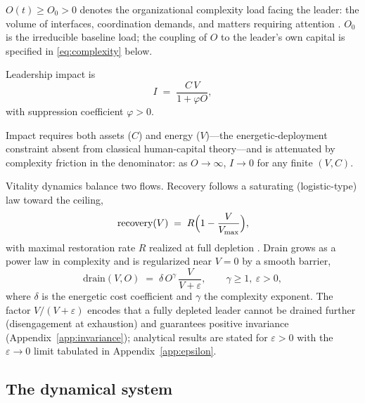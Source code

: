 \begin{definition}
\label{def:complexity}
$O(t) \ge O_0 > 0$ denotes the organizational complexity load facing the
leader: the volume of interfaces, coordination demands, and matters requiring
attention \citep{garicano2000hierarchies,hambrick2005executive}. $O_0$ is the
irreducible baseline load; the coupling of $O$ to the leader's own capital is
specified in \eqref{eq:complexity} below.
\end{definition}

\begin{definition}
\label{def:impact}
Leadership impact is
\begin{equation}
\label{eq:impact}
I \;=\; \frac{C\,V}{1+\varphi O},
\end{equation}
with suppression coefficient $\varphi>0$.
\end{definition}

Impact requires both assets ($C$) and energy ($V$)---the energetic-deployment
constraint absent from classical human-capital theory---and is attenuated by
complexity friction in the denominator: as $O\to\infty$, $I\to 0$ for any
finite $(V,C)$.

Vitality dynamics balance two flows. Recovery follows a saturating
(logistic-type) law toward the ceiling,
\begin{equation}
\label{eq:recovery}
\text{recovery}(V) \;=\; R\Bigl(1-\frac{V}{V_{\max}}\Bigr),
\end{equation}
with maximal restoration rate $R$ realized at full depletion
\citep{sonnentag2007recovery}. Drain grows as a power law in complexity and is
regularized near $V=0$ by a smooth barrier,
\begin{equation}
\label{eq:drain}
\text{drain}(V,O) \;=\; \delta\,O^{\gamma}\,\frac{V}{V+\varepsilon},
\qquad \gamma \ge 1,\ \varepsilon>0,
\end{equation}
where $\delta$ is the energetic cost coefficient and $\gamma$ the complexity
exponent. The factor $V/(V+\varepsilon)$ encodes that a fully depleted leader
cannot be drained further (disengagement at exhaustion) and guarantees
positive invariance (Appendix~\ref{app:invariance}); analytical results are
stated for $\varepsilon>0$ with the $\varepsilon\to0$ limit tabulated in
Appendix~\ref{app:epsilon}.

\subsection{The dynamical system}
\label{sec:system}

